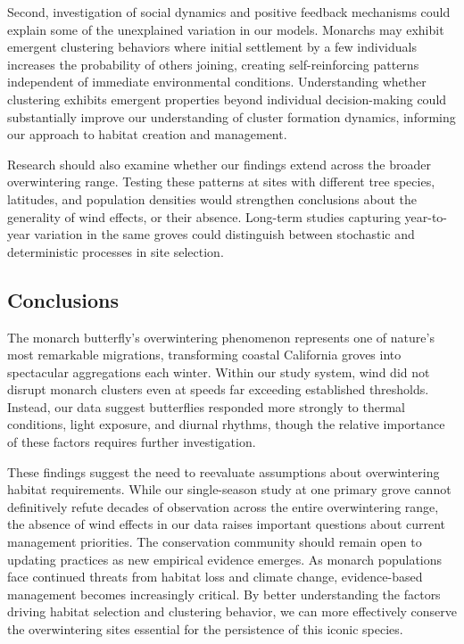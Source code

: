 Second, investigation of social dynamics and positive feedback mechanisms could explain some of the unexplained variation in our models. Monarchs may exhibit emergent clustering behaviors where initial settlement by a few individuals increases the probability of others joining, creating self-reinforcing patterns independent of immediate environmental conditions. Understanding whether clustering exhibits emergent properties beyond individual decision-making could substantially improve our understanding of cluster formation dynamics, informing our approach to habitat creation and management.

Research should also examine whether our findings extend across the broader overwintering range. Testing these patterns at sites with different tree species, latitudes, and population densities would strengthen conclusions about the generality of wind effects, or their absence. Long-term studies capturing year-to-year variation in the same groves could distinguish between stochastic and deterministic processes in site selection.

\subsection{Conclusions}

The monarch butterfly's overwintering phenomenon represents one of nature's most remarkable migrations, transforming coastal California groves into spectacular aggregations each winter. Within our study system, wind did not disrupt monarch clusters even at speeds far exceeding established thresholds. Instead, our data suggest butterflies responded more strongly to thermal conditions, light exposure, and diurnal rhythms, though the relative importance of these factors requires further investigation.

These findings suggest the need to reevaluate assumptions about overwintering habitat requirements. While our single-season study at one primary grove cannot definitively refute decades of observation across the entire overwintering range, the absence of wind effects in our data raises important questions about current management priorities. The conservation community should remain open to updating practices as new empirical evidence emerges. As monarch populations face continued threats from habitat loss and climate change, evidence-based management becomes increasingly critical. By better understanding the factors driving habitat selection and clustering behavior, we can more effectively conserve the overwintering sites essential for the persistence of this iconic species.